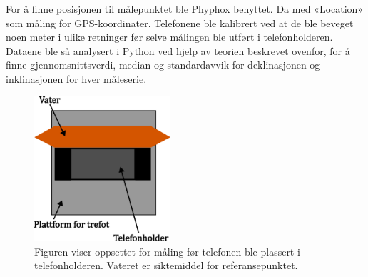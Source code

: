 For å finne posisjonen til målepunktet ble Phyphox benyttet. Da med «Location» som måling for GPS-koordinater. Telefonene ble kalibrert ved at de ble beveget noen meter i ulike retninger før selve målingen ble utført i telefonholderen. 
Dataene ble så analysert i Python ved hjelp av teorien beskrevet ovenfor, for å finne gjennomsnittsverdi, median og standardavvik for deklinasjonen og inklinasjonen for hver måleserie.     

 
\begin{figure}
    \centering
    \includegraphics[width=0.45\textwidth]{img/Plattform med vater.pdf}                 
    \caption{Figuren viser oppsettet for måling før telefonen ble plassert i telefonholderen. Vateret er siktemiddel for referansepunktet.
        }
    \label{fig:med_vater}
\end{figure} 